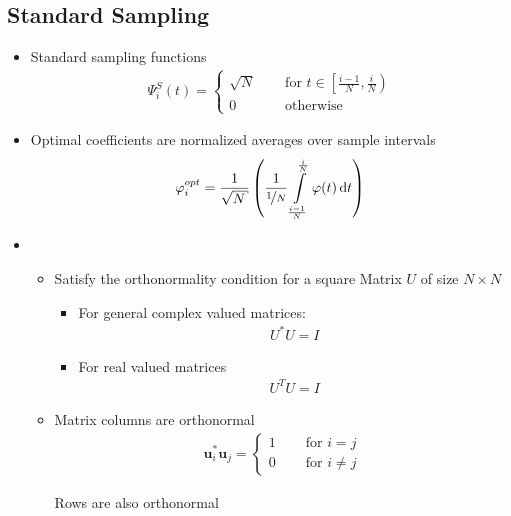 \subsection{Standard Sampling}
\begin{itemize}
	\item
		Standard sampling functions
		\begin{align*}
			\Psi_i^S(t) = \begin{cases}
				\sqrt{N} \quad& \text{ for } t \in \left[\frac{i-1}N, \frac{i}N\right)\\
				0 \quad& \text{ otherwise}
			\end{cases}
		\end{align*}
	\item
		Optimal coefficients are normalized averages over sample intervals
		\begin{align*}
			\phi_i^{opt} = \frac1{\sqrt{N}} \left(\frac{1}{\nicefrac{1}{N}} \intop_{\frac{i-1}{N}}^{\frac{i}{N}} \phi(t)  \id t \right)
		\end{align*}
	\item
		\begin{itemize}
			\item
				Satisfy the orthonormality condition for a square Matrix $U$ of size $N\times N$
				\begin{itemize}
					\item
						For general complex valued matrices:
						\begin{align*}
							U^*U = I
						\end{align*}
					\item
						For real valued matrices
						\begin{align*}
							U^TU=I
						\end{align*}
				\end{itemize}
			\item
				Matrix columns are orthonormal
				\begin{align*}
					\mathbf{u}_i^*\mathbf{u}_j = \begin{cases}
						1 \quad & \text{ for } i = j\\
						0 \quad & \text{ for } i \neq j
					\end{cases}
				\end{align*}
				
				Rows are also orthonormal
		\end{itemize}
\end{itemize}

